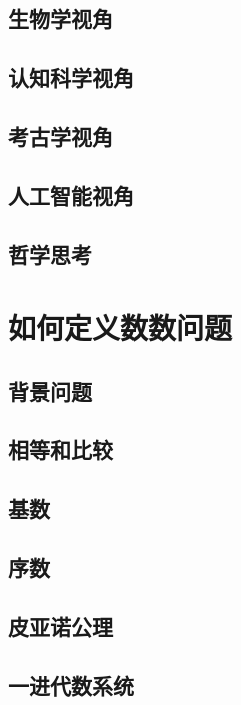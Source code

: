 \documentclass[a4paper,12pt]{article}
\begin{document}
\subsection{生物学视角}

\subsection{认知科学视角}

\subsection{考古学视角}

\subsection{人工智能视角}

\subsection{哲学思考}

\section{如何定义数数问题}

\subsection{背景问题}

\subsection{相等和比较}

\subsection{基数}

\subsection{序数}

\subsection{皮亚诺公理}

\subsection{一进代数系统}
\end{document}

